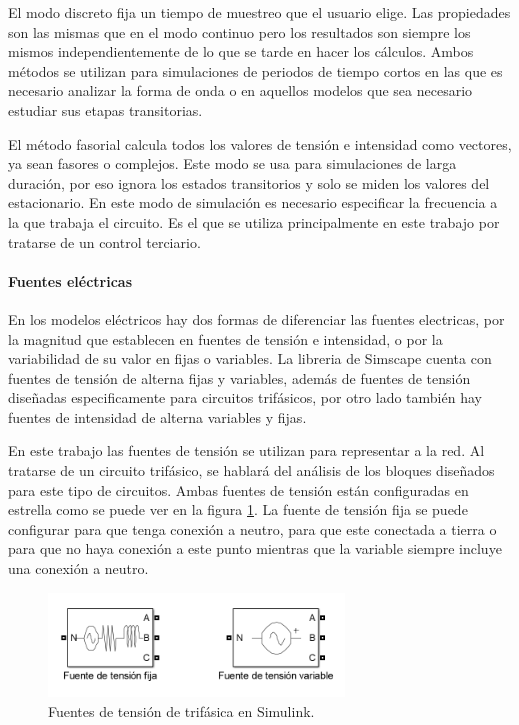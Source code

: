 \documentclass{book}
\begin{document}
El modo discreto fija un tiempo de muestreo que el usuario elige. Las propiedades son las mismas que en el modo continuo pero los resultados son siempre los mismos independientemente de lo que se tarde en hacer los c\'alculos. Ambos m\'etodos se utilizan para simulaciones de periodos de tiempo cortos en las que es necesario analizar la forma de onda o en aquellos modelos que sea necesario estudiar sus etapas transitorias. \par

El m\'etodo fasorial calcula todos los valores de tensi\'on e intensidad como vectores, ya sean fasores o complejos. Este modo se usa para simulaciones de larga duraci\'on, por eso ignora los estados transitorios y solo se miden los valores del estacionario. En este modo de simulaci\'on es necesario especificar la frecuencia a la que trabaja el circuito. Es el que se utiliza principalmente en este trabajo por tratarse de un control terciario. \par

		\paragraph {Fuentes el\'ectricas}
En los modelos el\'ectricos hay dos formas de diferenciar las fuentes electricas, por la magnitud que establecen en fuentes de tensi\'on e intensidad, o por la variabilidad de su valor en fijas o variables. La libreria de Simscape cuenta con fuentes de tensi\'on de alterna fijas y variables, además de fuentes de tensi\'on diseñadas especificamente para circuitos trif\'asicos, por otro lado tambi\'en hay fuentes de intensidad de alterna variables y fijas. \par

En este trabajo las fuentes de tensi\'on se utilizan para representar a la red. Al tratarse de un circuito trif\'asico, se hablar\'a del an\'alisis de los bloques diseñados para este tipo de circuitos. Ambas fuentes de tensi\'on est\'an configuradas en estrella como se puede ver en la figura \ref{VoltageSources}. La fuente de tensi\'on fija se puede configurar para que tenga conexi\'on a neutro, para que este conectada a tierra o para que no haya conexi\'on a este punto mientras que la variable siempre incluye una conexi\'on a neutro. \par

\begin{figure}[h!]
\centering
\includegraphics[width=0.7\textwidth]{VoltageSources.PNG}
\caption{Fuentes de tensi\'on de trif\'asica en Simulink. }
\label{VoltageSources}
\end{figure} \par
\end{document}
